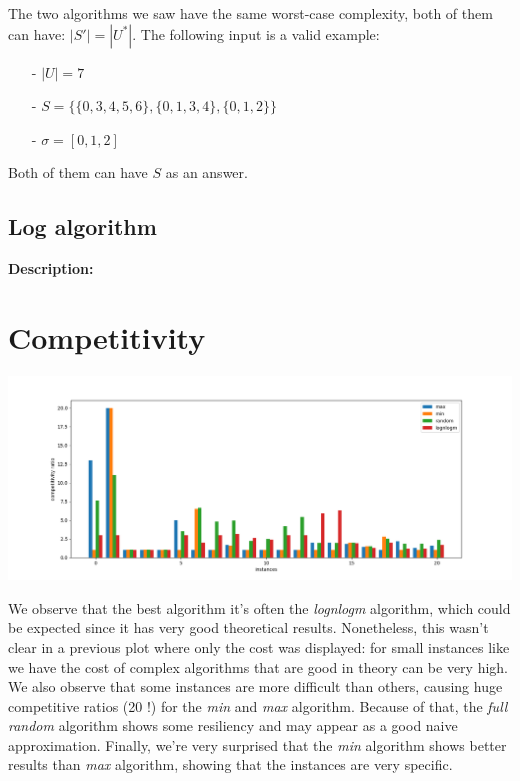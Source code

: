 \documentclass{article}
\begin{document}
The two algorithms we saw have the same worst-case complexity, both of them can have: $|S'| = |U^*|$.
The following input is a valid example:
\begin{itemize}
    \item[-] $|U| = 7$
    \item[-] $S = \{\{0, 3, 4, 5, 6\}, \{0, 1, 3, 4\}, \{0, 1, 2\}\}$
    \item[-] $\sigma = [0, 1, 2]$
\end{itemize}
Both of them can have $S$ as an answer.
\subsection{Log algorithm}
\textbf{Description:}

\section{Competitivity}
\hspace*{-2in}
\includegraphics[scale=0.6]{competitivity ratio.png}

We observe that the best algorithm it's often the \emph{lognlogm} algorithm, which could be expected since it has very good theoretical results. Nonetheless, this wasn't clear in a previous plot where only the cost was displayed: for small instances like we have the cost of complex algorithms that are good in theory can be very high. We also observe that some instances are more difficult than others, causing huge competitive ratios (20 !) for the \emph{min} and \emph{max} algorithm. Because of that, the \emph{full random} algorithm shows some resiliency and may appear as a good naive approximation. Finally, we're very surprised that the \emph{min} algorithm shows better results than \emph{max} algorithm, showing that the instances are very specific.
\end{document}
